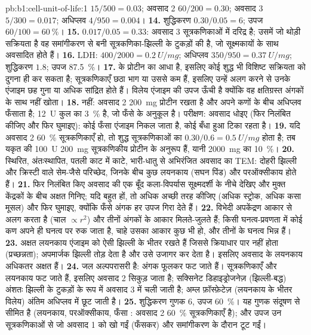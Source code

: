 \begin{solution}{pb:b1:cell-unit-of-life:1}
$15/500 = 0.03$; अवसाद 2 $60/200 = 0.30$; अवसाद 3 $5/300 = 0.017$;
अधिप्लव $4/950 = 0.004$।
\textbf{14.} शुद्धिकरण $0.30/0.05 = 6$; उपज $60/100 =
\qty{60}{\%}$।
\textbf{15.} $0.017/0.05 = 0.33$: अवसाद 3 सूत्रकणिकाओं में दरिद्र है; उसमें जो थोड़ी सक्रियता है वह समांगीकरण से बनी सूत्रकणिका-झिल्ली के टुकड़ों की है, जो सूक्ष्मकायों के साथ अवसादित होते हैं।
\textbf{16.} LDH:  $400/2000 = \qty{0.2}{U/mg}$; अधिप्लव
$350/950 = \qty{0.37}{U/mg}$; शुद्धिकरण $1.8$; उपज \qty{87.5}{\%}।
\textbf{17.}   के प्रोटीन का आधा है, इसलिए कोई शुद्ध
 भी विशिष्ट सक्रियता को दुगना ही कर सकता है; सूत्रकणिकाएँ
छठा भाग या उससे कम हैं, इसलिए उन्हें अलग करने से उनके एंजाइम छह गुना या
अधिक सांद्रित होते हैं। विलेय एंजाइम की उपज ऊँची है क्योंकि वह क्षतिग्रस्त
अंगकों के साथ नहीं खोता।
\textbf{18.} नहीं: अवसाद 2 \qty{200}{mg} प्रोटीन रखता है और अपने कणों के
बीच अधिप्लव फँसाता है; \qty{12}{U} कुल का \qty{3}{\%} है, जो फँसे
 के अनुकूल है। परीक्षण: अवसाद धोइए
(फिर निलंबित कीजिए और फिर घुमाइए): कोई फँसा एंजाइम निकल जाता है, कोई
बँधा हुआ टिका रहता है।
\textbf{19.} यदि अवसाद 2 \qty{60}{\%} सूत्रकणिकाएँ हो, तो शुद्ध
सूत्रकणिकाओं का $0.30/0.6 = \qty{0.5}{U/mg}$ होता है; तब यकृत की
\qty{100}{U} \qty{200}{mg} सूत्रकणिकीय प्रोटीन के अनुरूप हैं, यानी
\qty{2000}{mg} का \qty{10}{\%}।
\textbf{20.} स्थिरित, अंतःस्थापित, पतली काट में काटे, भारी-धातु से
अभिरंजित अवसाद का TEM: दोहरी झिल्ली और क्रिस्टी वाले सेम-जैसे परिच्छेद,
जिनके बीच कुछ लयनकाय (सघन पिंड) और परऑक्सीकाय होते हैं।
\textbf{21.} फिर निलंबित किए अवसाद की एक बूँद कला-विपर्यास सूक्ष्मदर्शी के नीचे देखिए और मुक्त केंद्रकों के बीच अक्षत  गिनिए; यदि बहुत हों, तो अधिक अच्छी तरह  कीजिए (अधिक स्ट्रोक, अधिक कसा मूसल) और फिर घुमाइए, क्योंकि फँसे अंगक हर उपज गिरा देते हैं।
\textbf{22.} विभेदी अपकेंद्रण आकार से अलग करता है (चाल
$\propto r^2$) और तीनों अंगकों के आकार मिलते-जुलते हैं; किसी
घनत्व-प्रवणता में कोई कण अपने ही घनत्व पर रुक जाता है, चाहे उसका आकार
कुछ भी हो, और तीनों के घनत्व भिन्न हैं।
\textbf{23.} अक्षत लयनकाय एंजाइम को ऐसी झिल्ली के भीतर रखते हैं जिससे
क्रियाधार पार नहीं होता (प्रच्छन्नता); अपमार्जक झिल्ली तोड़ देता है और
उसे उजागर कर देता है। इसलिए अवसाद के लयनकाय अधिकतर अक्षत हैं।
\textbf{24.} जल अल्पपरासरी है: अंगक फूलकर फट जाते हैं।
सूत्रकणिकाएँ और लयनकाय फट जाते हैं, इसलिए अवसाद 2 सिकुड़ जाता है;
सक्सिनेट डिहाइड्रोजनेज़ (झिल्ली-बद्ध) अंशतः झिल्ली के टुकड़ों के रूप में
अवसाद 3 में चली जाती है; अम्ल फ़ॉस्फ़ेटेज़ (लयनकाय के भीतर विलेय) अंतिम
अधिप्लव में छूट जाती है।
\textbf{25.} शुद्धिकरण गुणक $6$, उपज \qty{60}{\%}। यह गुणक
संदूषण से सीमित है (लयनकाय, परऑक्सीकाय, फँसा :
अवसाद 2 \qty{60}{\%} सूत्रकणिकाएँ है); और उपज उन सूत्रकणिकाओं से जो
अवसाद 1 को खो गईं (फँसकर) और समांगीकरण के दौरान टूट गईं।
\end{solution}
